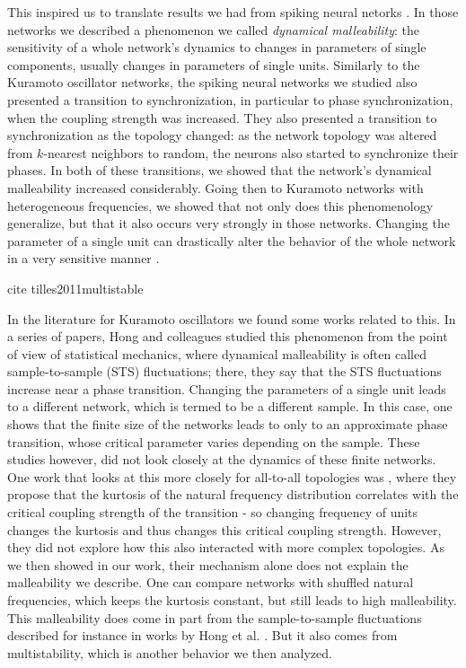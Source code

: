 This inspired us to translate results we had from spiking neural netorks \cite{budzinski2020synchronization}. In those networks we described a phenomenon we called \textit{dynamical malleability}: the sensitivity of a whole network's dynamics to changes in parameters of single components, usually changes in parameters of single units. Similarly to the Kuramoto oscillator networks, the spiking neural networks we studied also presented a transition to synchronization, in particular to phase synchronization, when the coupling strength was increased. They also presented a transition to synchronization as the topology changed: as the network topology was altered from $k$-nearest neighbors to random, the neurons also started to synchronize their phases. In both of these transitions, we showed that the network's dynamical malleability increased considerably. Going then to Kuramoto networks with heterogeneous frequencies, we showed that not only does this phenomenology generalize, but that it also occurs very strongly in those networks. Changing the parameter of a single unit can drastically alter the behavior of the whole network in a very sensitive manner \cite{}. 

cite tilles2011multistable

In the literature for Kuramoto oscillators we found some works related to this. In a series of papers, Hong and colleagues studied this phenomenon from the point of view of statistical mechanics, where dynamical malleability is often called sample-to-sample (STS) fluctuations; there, they say that the STS fluctuations increase near a phase transition. Changing the parameters of a single unit leads to a different network, which is termed to be a different sample. In this case, one shows that the finite size of the networks leads to only to an approximate phase transition, whose critical parameter varies depending on the sample. These studies however, did not look closely at the dynamics of these finite networks. One work that looks at this more closely for all-to-all topologies was , where they propose that the kurtosis of the natural frequency distribution correlates with the critical coupling strength of the transition - so changing frequency of units changes the kurtosis and thus changes this critical coupling strength. However, they did not explore how this also interacted with more complex topologies. As we then showed in our work, their mechanism alone does not explain the malleability we describe. One can compare networks with shuffled natural frequencies, which keeps the kurtosis constant, but still leads to high malleability. This malleability does come in part from the sample-to-sample fluctuations described for instance in works by Hong et al. \cite{hong2007entrainment}. But it also comes from multistability, which is another behavior we then analyzed. 

